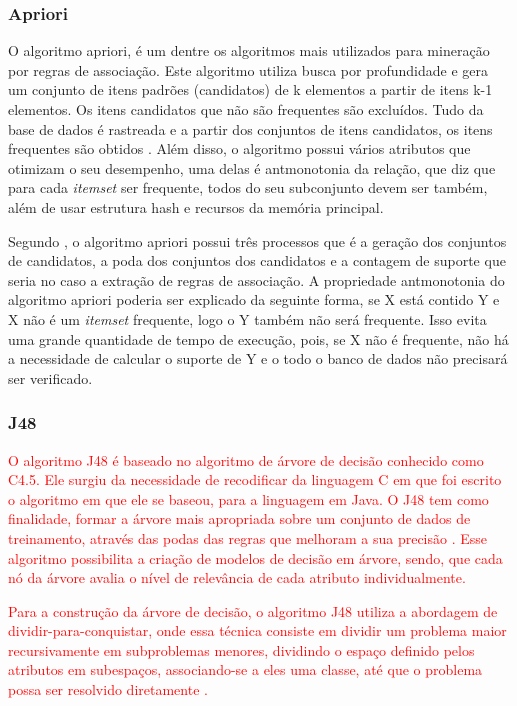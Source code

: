 \subsubsection{Apriori}

\par
O algoritmo apriori, é um dentre os algoritmos mais utilizados para mineração por regras de associação. Este algoritmo utiliza busca por profundidade e gera um conjunto de itens padrões (candidatos) de k elementos a partir de itens k-1 elementos. Os itens candidatos que não são frequentes são excluídos. Tudo da base de dados é rastreada e a partir dos conjuntos de itens candidatos, os itens frequentes são obtidos \cite{Vasconcelos2004}. Além disso, o algoritmo possui vários atributos que otimizam o seu desempenho, uma delas é antmonotonia da relação, que diz que para cada \textit{itemset} ser frequente, todos do seu subconjunto devem ser também, além de usar estrutura hash e recursos da memória principal.

\par
Segundo , o algoritmo apriori possui três processos que é a geração dos conjuntos de candidatos, a poda dos conjuntos dos candidatos e a contagem de suporte que seria no caso a extração de regras de associação. A propriedade antmonotonia do algoritmo apriori poderia ser explicado da seguinte forma, se X está contido Y e X não é um \textit{itemset} frequente, logo o Y também não será frequente. Isso evita uma grande quantidade de tempo de execução, pois, se X não é frequente, não há a necessidade de calcular o suporte de Y e o todo o banco de dados não precisará ser verificado.


\subsubsection{J48}

\textcolor{red}{O algoritmo J48 é baseado no algoritmo de árvore de decisão conhecido como C4.5. Ele surgiu da necessidade de recodificar da linguagem C em que foi escrito o algoritmo em que ele se baseou, para a linguagem em Java. O J48 tem como finalidade, formar a árvore mais apropriada sobre um conjunto de dados de treinamento, através das podas das regras que melhoram a sua precisão \cite{Marques2014, Librelotto2014}. Esse algoritmo possibilita a criação de modelos de decisão em árvore, sendo, que cada nó da árvore avalia o nível de relevância de cada atributo individualmente.}

\par
\textcolor{red}{Para a construção da árvore de decisão, o algoritmo J48 utiliza a abordagem de dividir-para-conquistar, onde essa técnica consiste em dividir um problema maior recursivamente em subproblemas menores, dividindo o espaço definido pelos atributos em subespaços, associando-se a eles uma classe, até que o problema possa ser resolvido diretamente \cite{Librelotto2014}.}


